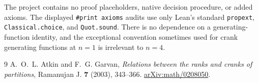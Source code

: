 \documentclass[11pt]{article}
\begin{document}
The project contains no proof placeholders, native decision procedure,
or added axioms. The displayed \texttt{\#print axioms} audits use only
Lean's standard \texttt{propext}, \texttt{Classical.choice}, and
\texttt{Quot.sound}. There is no dependence on a generating-function
identity, and the exceptional convention sometimes used for crank
generating functions at $n=1$ is irrelevant to $n=4$.

\begin{thebibliography}{9}
A.~O.~L. Atkin and F.~G. Garvan,
\emph{Relations between the ranks and cranks of partitions},
Ramanujan J. \textbf{7} (2003), 343--366.
\href{https://arxiv.org/abs/math/0208050}{arXiv:math/0208050}.
\end{thebibliography}
\end{document}
